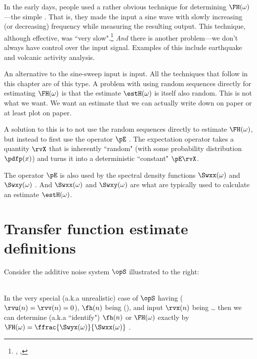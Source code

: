In the early days, people used a rather obvious technique for determining $\FH(\omega)$---the simple
. That is, they made the input a sine wave with slowly increasing (or decreasing)
frequency while measuring the resulting output.
This technique, although effective, was ``very slow".\footnote{
  ,
  ,
  }
\emph{And} there is another problem---we don't always have control over the input signal.
Examples of this include earthquake and volcanic activity analysis.

An alternative to the sine-sweep input is  input.
All the techniques that follow in this chapter are of this type.
A problem with using random sequences directly for estimating $\FH(\omega)$ is that the
estimate $\estH(\omega)$ is itself also random.
This is not what we want. We want an estimate that we can actually write down
on paper or at least plot on paper.

A solution to this is to not use the random sequences directly to estimate $\FH(\omega)$,
but instead to first use the  operator $\pE$ .
The expectation operator takes a quantity $\rvX$ that is inherently ``random"
(with some probability distribution $\pdfp(x)$) and
turns it into a deterministic ``constant" $\pE\rvX$.

The operator $\pE$ is also used by the spectral density functions
$\Swxx(\omega)$ and $\Swxy(\omega)$ .
And $\Swxx(\omega)$ and $\Swxy(\omega)$ are what are typically used to calculate
an estimate $\estH(\omega)$.

\section{Transfer function estimate definitions}
\begin{minipage}{\tw-70mm}
Consider the additive noise system $\opS$ illustrated to the right:
\end{minipage}
\hfill{}
\\
In the very special (a.k.a unrealistic) case of $\opS$ having 
($\rvu(n)=\rvv(n)=0$),
$\fh(n)$ being  (),
and input $\rvx(n)$ being \ldots
then we can determine (a.k.a ``identify") $\fh(n)$ or $\FH(\omega)$
exactly by $\FH(\omega)=\ffrac{\Swyx(\omega)}{\Swxx(\omega)}$ .

